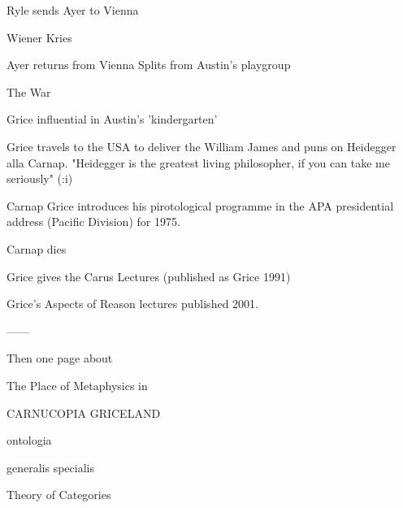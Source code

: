 \documentclass[10pt,titlepage]{book}
\begin{document}
                                           Ryle sends Ayer to 
                                               Vienna
 
 Wiener Kries
 
 
                                     Ayer returns from Vienna
                              Splits from Austin's playgroup
 
                     The War
 
                                     Grice influential
                                      in Austin's 'kindergarten'
 
                          
                                      Grice  travels to the USA
                                       to deliver the William James
                                       and puns on Heidegger alla
                                       Carnap.
                                    "Heidegger is the greatest living
                                     philosopher, if you can take
                                     me seriously" (\cite{grice89}:i)
 
 
   Carnap       
                                     Grice introduces his pirotological
                                      programme in the APA presidential
                                      address (Pacific Division) for 1975.
 
 
      Carnap dies
 
                                     Grice gives the Carus Lectures
                                           (published as Grice 1991)
 
                                    Grice's Aspects of Reason lectures
                                            published 2001.
 
 
 
------
 
 
Then one page about 
 
                The Place of Metaphysics in
 
 
CARNUCOPIA                                   GRICELAND
 
 
                                                       ontologia
 
 
                                       generalis                           
specialis
 
                                    Theory of Categories
 
\end{document}
